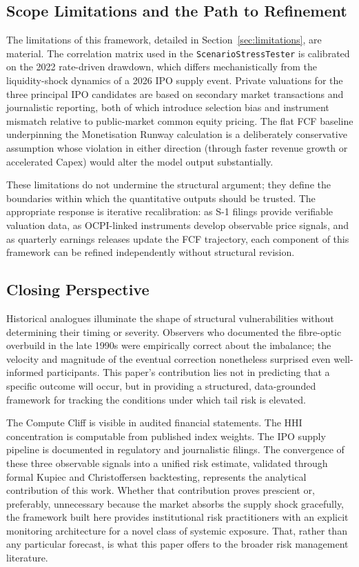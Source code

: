 \subsection{Scope Limitations and the Path to Refinement}

The limitations of this framework, detailed in Section~\ref{sec:limitations}, are
material. The correlation matrix used in the \texttt{ScenarioStressTester} is
calibrated on the 2022 rate-driven drawdown, which differs mechanistically from the
liquidity-shock dynamics of a 2026 IPO supply event. Private valuations for the
three principal IPO candidates are based on secondary market transactions and
journalistic reporting, both of which introduce selection bias and instrument
mismatch relative to public-market common equity pricing. The flat FCF baseline
underpinning the Monetisation Runway calculation is a deliberately conservative
assumption whose violation in either direction (through faster revenue growth or
accelerated Capex) would alter the model output substantially.

These limitations do not undermine the structural argument; they define the
boundaries within which the quantitative outputs should be trusted. The appropriate
response is iterative recalibration: as S-1 filings provide verifiable valuation
data, as OCPI-linked instruments develop observable price signals, and as quarterly
earnings releases update the FCF trajectory, each component of this framework can
be refined independently without structural revision.

\subsection{Closing Perspective}

Historical analogues illuminate the shape of structural vulnerabilities without
determining their timing or severity. Observers who documented the fibre-optic
overbuild in the late 1990s were empirically correct about the imbalance; the
velocity and magnitude of the eventual correction nonetheless surprised even
well-informed participants. This paper's contribution lies not in predicting that
a specific outcome will occur, but in providing a structured, data-grounded
framework for tracking the conditions under which tail risk is elevated.

The Compute Cliff is visible in audited financial statements. The HHI concentration
is computable from published index weights. The IPO supply pipeline is documented
in regulatory and journalistic filings. The convergence of these three observable
signals into a unified risk estimate, validated through formal Kupiec and
Christoffersen backtesting, represents the analytical contribution of this work.
Whether that contribution proves prescient or, preferably, unnecessary because the
market absorbs the supply shock gracefully, the framework built here provides
institutional risk practitioners with an explicit monitoring architecture for a
novel class of systemic exposure. That, rather than any particular forecast, is
what this paper offers to the broader risk management literature.
